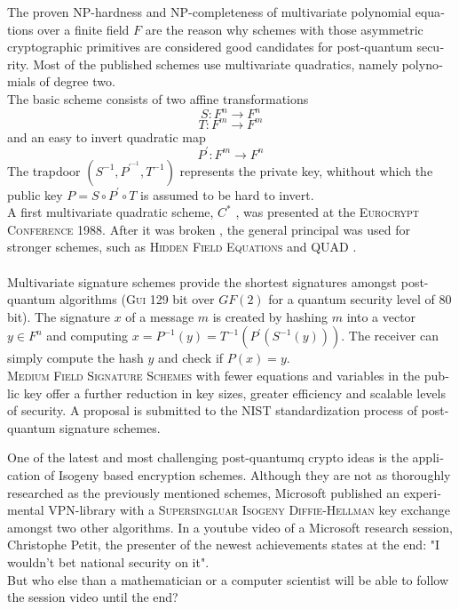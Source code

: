 \documentclass[a4paper,11pt]{article}
\begin{document}
\begin{otherlanguage}{english}
\begin{multicols}{2}
\noindent
The proven NP-hardness and NP-completeness of multivariate polynomial equations over a finite field $F$ are the reason why schemes with those asymmetric cryptographic primitives are considered good candidates for post-quantum security. Most of the published schemes use multivariate quadratics, namely polynomials of degree two. \\
The basic scheme consists of two affine transformations 
$$S: F^n \rightarrow F^n$$
$$T: F^m \rightarrow F^m$$
and an easy to invert quadratic map 
$$P^{\prime} : F^m \rightarrow F^n$$ 
\noindent
The trapdoor $(S^{-1}, P^{\prime^{-1}}, T^{-1})$ represents the private key, whithout which the public key $P = S \circ P^{\prime} \circ T$ is assumed to be hard to invert.\\ 
A first multivariate quadratic scheme, $C^*$ \cite{MI}, was presented at the \textsc{Eurocrypt Conference} 1988. After it was broken \cite{P95}, the general principal was used for stronger schemes, such as \textsc{Hidden Field Equations} \cite{HFE} and \textsc{QUAD} \cite{BGP}. \\
\\
Multivariate signature schemes provide the shortest signatures amongst post-quantum algorithms (\textsc{Gui} \cite{GUI} 129 bit over $GF(2)$ for a quantum security level of 80 bit). The signature $x$ of a message $m$ is created by hashing $m$ into a vector $y \in F^n$ and computing $x = P^{-1}(y) = T^{-1} (P^{\prime}(S^{-1}(y)))$. The receiver can simply compute the hash $y$ and check if $P(x) = y$. \\
\textsc{Medium Field Signature Schemes} \cite{HMFE} with fewer equations and variables in the public key offer  a further reduction in key sizes, greater efficiency and scalable levels of security. A proposal is submitted to the NIST standardization process of post-quantum signature schemes.

One of the latest and most challenging post-quantumq crypto ideas is the application of Isogeny based encryption schemes. Although they are not as thoroughly researched as the previously mentioned schemes, Microsoft published an experimental VPN-library with a \textsc{Supersingluar Isogeny Diffie-Hellman} key exchange amongst two other algorithms. In a youtube video of a Microsoft research session, Christophe Petit, the presenter of the newest achievements states at the end: "I wouldn't bet national security on it". \\
But who else than a mathematician or a computer scientist will be able to follow the session video until the end?



\end{multicols}
\end{otherlanguage}
\end{document}
